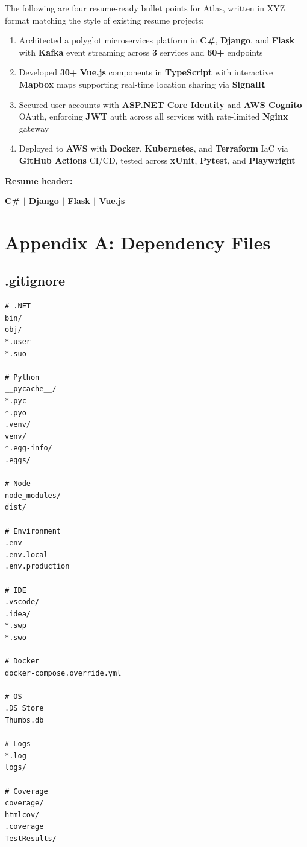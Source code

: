 \documentclass[12pt,letterpaper]{article}
\begin{document}
The following are four resume-ready bullet points for Atlas, written in XYZ format matching the style of existing resume projects:

\begin{enumerate}
  \item Architected a polyglot microservices platform in \textbf{C\#}, \textbf{Django}, and \textbf{Flask} with \textbf{Kafka} event streaming across \textbf{3} services and \textbf{60+} endpoints
  \item Developed \textbf{30+} \textbf{Vue.js} components in \textbf{TypeScript} with interactive \textbf{Mapbox} maps supporting real-time location sharing via \textbf{SignalR}
  \item Secured user accounts with \textbf{ASP.NET Core Identity} and \textbf{AWS Cognito} OAuth, enforcing \textbf{JWT} auth across all services with rate-limited \textbf{Nginx} gateway
  \item Deployed to \textbf{AWS} with \textbf{Docker}, \textbf{Kubernetes}, and \textbf{Terraform} IaC via \textbf{GitHub Actions} CI/CD, tested across \textbf{xUnit}, \textbf{Pytest}, and \textbf{Playwright}
\end{enumerate}

\textbf{Resume header:}
\begin{center}
\textbf{C\# $|$ Django $|$ Flask $|$ Vue.js}
\end{center}

\newpage

\section{Appendix A: Dependency Files}

\subsection{.gitignore}
\begin{lstlisting}[style=code]
# .NET
bin/
obj/
*.user
*.suo

# Python
__pycache__/
*.pyc
*.pyo
.venv/
venv/
*.egg-info/
.eggs/

# Node
node_modules/
dist/

# Environment
.env
.env.local
.env.production

# IDE
.vscode/
.idea/
*.swp
*.swo

# Docker
docker-compose.override.yml

# OS
.DS_Store
Thumbs.db

# Logs
*.log
logs/

# Coverage
coverage/
htmlcov/
.coverage
TestResults/
\end{lstlisting}
\end{document}
